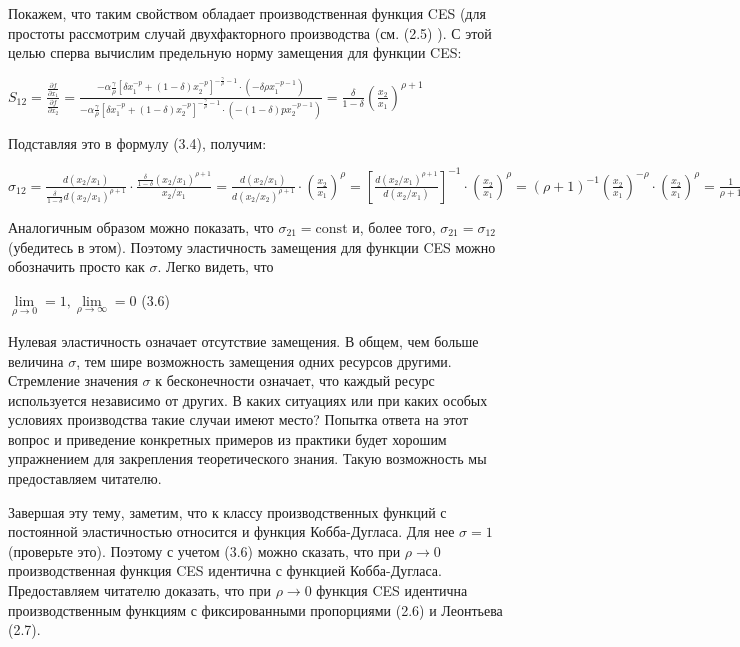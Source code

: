 \documentclass[12pt, 4paper]{book}
\begin{document}
{Покажем, что таким свойством обладает производственная функция CES (для простоты рассмотрим случай двухфакторного производства (см. (2.5) ). С этой целью сперва вычислим предельную норму замещения для функции CES: 
\begin{center}
$S_{12}=\frac{\frac{\partial f}{\partial x_1}}{\frac{\partial f}{\partial x_2}}=\frac{-\alpha \frac{\gamma}{\rho}[\delta x_{1}^{-p} + (1-\delta) x_{2}^{-p}]^{-\frac{\gamma}{\rho}-1} \cdot (-\delta \rho x_1^{-p-1})}{ -\alpha \frac{\gamma}{\rho}[\delta x_{1}^{-p} + (1-\delta) x_{2}^{-p}]^{-\frac{\gamma}{\rho}-1}  \cdot (-(1-\delta)p x_{2}^{-p-1})}=\frac{\delta}{1 - \delta}(\frac{x_2}{x_1})^{\rho+1}$
\end{center}
\par

Подставляя это в формулу (3.4), получим: 
\begin{center}
$\sigma_{12}=\frac{d(x_2/x_1)}{\frac{\delta}{1-\delta}d(x_2/x_1)^{\rho+1}}\cdot \frac{\frac{\delta}{1 - \delta}(x_2/x_1)^{\rho +1}}{x_2/x_1}=\frac{d(x_2/x_1)}{d(x_2/x_2)^{\rho + 1}}\cdot (\frac{x_2}{x_1})^{\rho}=[\frac{d(x_2/x_1)^{\rho+1}}{d(x_2/x_1)}]^{-1} \cdot (\frac{x_2}{x_1})^{\rho}=(\rho +1 )^{-1}(\frac{x_2}{x_1})^{-\rho} \cdot (\frac{x_2}{x_1})^{\rho}= \frac{1}{\rho + 1} = \text{const}$
\end{center}
\par

Аналогичным образом можно показать, что $\sigma_{21}=\text{const}$ и, более того, $\sigma_{21}=\sigma_{12}$ (убедитесь в этом). Поэтому эластичность замещения для функции CES можно обозначить просто как $\sigma$. Легко видеть, что 
\begin{center}
$\lim\limits_{\rho \rightarrow 0} = 1, \lim\limits_{\rho \rightarrow \infty}=0$ (3.6)
\end{center}
\par

Нулевая эластичность означает отсутствие замещения. В общем, чем больше величина $\sigma$, тем шире возможность замещения одних ресурсов другими. Стремление значения $\sigma$ к бесконечности означает, что каждый ресурс используется независимо от других. В каких ситуациях или при каких особых условиях производства такие случаи имеют место? Попытка ответа на этот вопрос и приведение конкретных примеров из практики будет хорошим упражнением для закрепления теоретического знания. Такую возможность мы предоставляем читателю. 
\par

Завершая эту тему, заметим, что к классу производственных функций с постоянной эластичностью относится и функция Кобба-Дугласа. Для нее $\sigma = 1$ (проверьте это). Поэтому с учетом (3.6) можно сказать, что при $\rho \rightarrow 0$ производственная функция CES идентична с функцией Кобба-Дугласа. Предоставляем читателю доказать, что при $\rho \rightarrow 0$ функция CES идентична производственным функциям с фиксированными пропорциями (2.6) и Леонтьева (2.7). 
\newpage
\begin{center}

\end{center}}
\end{document}
